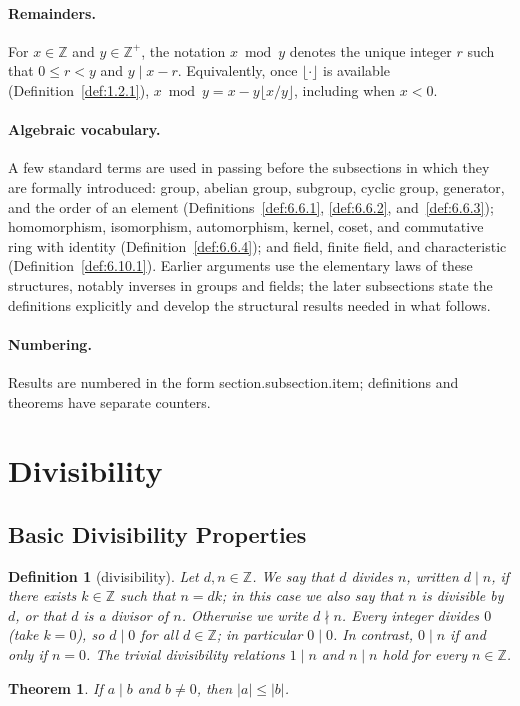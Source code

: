 \documentclass[11pt]{article}
\theoremstyle{ntstyle}
\newtheorem{theorem}{Theorem}[subsection]
\newtheorem{definition}{Definition}[subsection]
\begin{document}
\paragraph*{Remainders.}
For $x\in\mathbb{Z}$ and $y\in\mathbb{Z}^+$, the notation $x\bmod y$ denotes the unique integer $r$ such that $0\le r<y$ and $y\mid x-r$. Equivalently, once $\lfloor\cdot\rfloor$ is available (Definition~\ref{def:1.2.1}), $x\bmod y=x-y\lfloor x/y\rfloor$, including when $x<0$.

\paragraph*{Algebraic vocabulary.}
A few standard terms are used in passing before the subsections in which they are formally introduced: group, abelian group, subgroup, cyclic group, generator, and the order of an element (Definitions~\ref{def:6.6.1}, \ref{def:6.6.2}, and~\ref{def:6.6.3}); homomorphism, isomorphism, automorphism, kernel, coset, and commutative ring with identity (Definition~\ref{def:6.6.4}); and field, finite field, and characteristic (Definition~\ref{def:6.10.1}). Earlier arguments use the elementary laws of these structures, notably inverses in groups and fields; the later subsections state the definitions explicitly and develop the structural results needed in what follows.

\paragraph*{Numbering.}
Results are numbered in the form section.subsection.item; definitions and theorems have separate counters.

\clearpage

\section{Divisibility}

\subsection{Basic Divisibility Properties}

\begin{definition}[divisibility]\label{def:1.1.1}
	Let $d,n\in\mathbb{Z}$.
	We say that $d$ divides $n$, written $d\mid n$, if there exists $k\in\mathbb{Z}$ such that $n=dk$; in this case we also say that $n$ is divisible by $d$, or that $d$ is a divisor of $n$.
	Otherwise we write $d\nmid n$.
	Every integer divides $0$ (take $k=0$), so $d\mid0$ for all $d\in\mathbb{Z}$; in particular $0\mid0$.
	In contrast, $0\mid n$ if and only if $n=0$.
	The trivial divisibility relations $1\mid n$ and $n\mid n$ hold for every $n\in\mathbb{Z}$.

\end{definition}
\begin{theorem}\label{thm:1.1.1}
	If $a\mid b$ and $b\ne0$, then $|a|\le|b|$.

\end{theorem}
\end{document}

